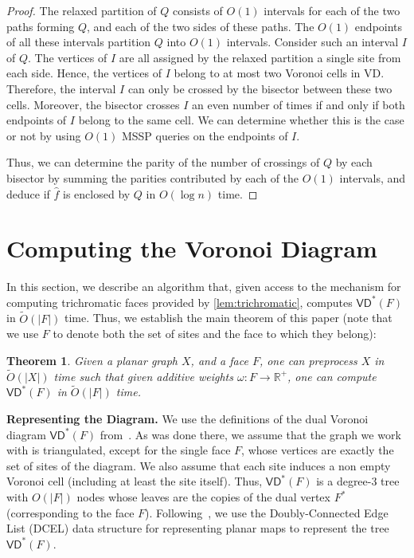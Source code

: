 \documentclass{article}
\newcommand{\VD}{\textsf{VD}}
\newcommand{\X}{X}
\newtheorem{theorem}{Theorem}
\newcommand{\R}{\mathbb{R}}
\newcommand{\Otild}{\tilde{O}}
\begin{document}
\begin{proof}
The relaxed partition of $Q$ consists of $O(1)$ intervals for each of the two paths forming $Q$, and each of the two sides of these paths.
The $O(1)$ endpoints of all these intervals partition $Q$ into $O(1)$ intervals.
Consider such an interval $I$ of $Q$. The vertices of $I$ are all assigned by the relaxed partition a single site from each side. Hence, the vertices of $I$ belong to at most two Voronoi cells in VD. Therefore, the interval $I$ can only be crossed by the bisector between these two cells.
Moreover, the bisector crosses $I$ an even number of times if and only if both endpoints of  $I$ belong to the same cell. We can determine whether this is the case or not by using $O(1)$ MSSP queries on the endpoints of $I$.

Thus, we can determine the parity of the number of crossings of $Q$ by each bisector by summing the parities contributed by each of the $O(1)$ intervals, and deduce if $\hat f$ is enclosed by $Q$ in $O(\log n)$ time.
\end{proof}

\section{Computing the Voronoi Diagram}\label{sec:computingVD}

In this section, we describe an algorithm that, given access to the mechanism for computing trichromatic faces provided by
\cref{lem:trichromatic}, computes $\VD^*(F)$ in $\Otild(|F|)$ time. Thus, we establish the main theorem of this paper (note that we use $F$ to denote both the set of sites and the face to which they belong):

\begin{theorem}\label{thm:main}
    Given a planar graph $\X$, and a face $F$, one can preprocess $\X$ in $\Otild(|\X|)$ time such that given  additive weights $\omega: F \rightarrow \R^+$, one can compute $\VD^*(F)$ in $\Otild(|F|)$ time.
\end{theorem}


\noindent
{\bf Representing the Diagram.}
We use the definitions of the dual Voronoi diagram $\VD^*(F)$ from~\cite{ourJACM}.
As was done there, we assume that the graph we work with is triangulated, except for the single face $F$, whose vertices are exactly the set of sites of the diagram. We also assume that each site induces a non empty Voronoi cell (including at least the site itself).
Thus, $\VD^*(F)$ is a degree-3 tree with $O(|F|)$ nodes whose leaves are the copies of the dual vertex $F^*$ (corresponding to the face $F$).
Following~\cite{DBLP:journals/siamcomp/GawrychowskiKMS21}, we use the Doubly-Connected Edge List (DCEL) data structure for representing planar maps to represent the tree $\VD^*(F)$.
\end{document}
